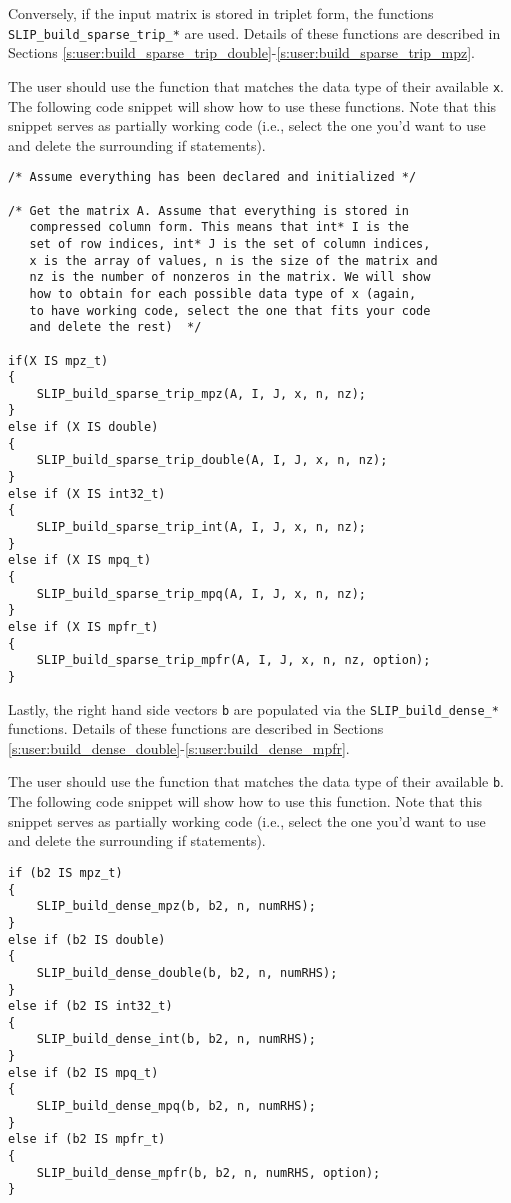 \documentclass[12pt]{article}
\theoremstyle{definition}
\begin{document}
Conversely, if the input matrix is stored in triplet form, the functions \verb|SLIP_build_sparse_trip_*| are used. Details of these functions are described in Sections \ref{s:user:build_sparse_trip_double}-\ref{s:user:build_sparse_trip_mpz}.

The user should use the function that matches the data type of their available \verb|x|. The following code snippet will show how to use these functions. Note that this snippet serves as partially working code (i.e., select the one you'd want to use and delete the surrounding if statements).

\begin{verbatim}
/* Assume everything has been declared and initialized */

/* Get the matrix A. Assume that everything is stored in
   compressed column form. This means that int* I is the
   set of row indices, int* J is the set of column indices,
   x is the array of values, n is the size of the matrix and
   nz is the number of nonzeros in the matrix. We will show
   how to obtain for each possible data type of x (again,
   to have working code, select the one that fits your code
   and delete the rest)  */

if(X IS mpz_t)
{
    SLIP_build_sparse_trip_mpz(A, I, J, x, n, nz);
}
else if (X IS double)
{
    SLIP_build_sparse_trip_double(A, I, J, x, n, nz);
}
else if (X IS int32_t)
{
    SLIP_build_sparse_trip_int(A, I, J, x, n, nz);
}
else if (X IS mpq_t)
{
    SLIP_build_sparse_trip_mpq(A, I, J, x, n, nz);
}
else if (X IS mpfr_t)
{
    SLIP_build_sparse_trip_mpfr(A, I, J, x, n, nz, option);
}

\end{verbatim}

Lastly, the right hand side vectors \verb|b| are populated via the \verb|SLIP_build_dense_*| functions. Details of these functions are described in Sections \ref{s:user:build_dense_double}-\ref{s:user:build_dense_mpfr}.

The user should use the function that matches the data type of their available \verb|b|. The following code snippet will show how to use this function. Note that this snippet serves as partially working code (i.e., select the one you'd want to use and delete the surrounding if statements).

\begin{verbatim}
if (b2 IS mpz_t)
{
    SLIP_build_dense_mpz(b, b2, n, numRHS);
}
else if (b2 IS double)
{
    SLIP_build_dense_double(b, b2, n, numRHS);
}
else if (b2 IS int32_t)
{
    SLIP_build_dense_int(b, b2, n, numRHS);
}
else if (b2 IS mpq_t)
{
    SLIP_build_dense_mpq(b, b2, n, numRHS);
}
else if (b2 IS mpfr_t)
{
    SLIP_build_dense_mpfr(b, b2, n, numRHS, option);
}


\end{verbatim}
\end{document}
